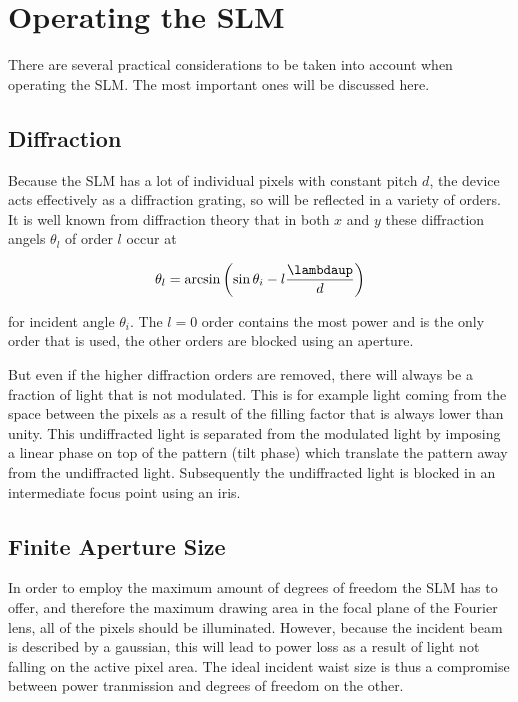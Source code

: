 \section{Operating the SLM}

There are several practical considerations to be taken into account when operating the SLM. The most important ones will be discussed here. 

\subsection{Diffraction}\label{subsec:Diffraction}

Because the SLM has a lot of individual pixels with constant pitch $d$, the device acts effectively as a diffraction grating, so will be reflected in a variety of orders. It is well known from diffraction theory that in both $x$ and $y$ these diffraction angels $\theta_l$ of order $l$ occur at

\begin{equation}
    \theta_l = \arcsin\left(\sin\theta_i - l\frac{ \lambdaup}{d}\right)
\end{equation}

for incident angle $\theta_i$. The $l=0$ order contains the most power and is the only order that is used, the other orders are blocked using an aperture. 

But even if the higher diffraction orders are removed, there will always be a fraction of light that is not modulated. This is for example light coming from the space between the pixels as a result of the filling factor that is always lower than unity. This undiffracted light is separated from the modulated light by imposing a linear phase on top of the pattern (tilt phase) which translate the pattern away from the undiffracted light. Subsequently the undiffracted light is blocked in an intermediate focus point using an iris. 

\subsection{Finite Aperture Size}\label{subsec:ApertureSize}

In order to employ the maximum amount of degrees of freedom the SLM has to offer, and therefore the maximum drawing area in the focal plane of the Fourier lens, all of the pixels should be illuminated. However, because the incident beam is described by a gaussian, this will lead to power loss as a result of light not falling on the active pixel area. The ideal incident waist size is thus a compromise between power tranmission and degrees of freedom on the other.
    
